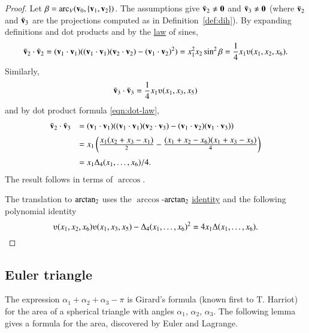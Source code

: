 \begin{proof}
Let $\beta = \operatorname{arc}_V({\mathbf v}_0,\{{\mathbf v}_1,{\mathbf v}_2\})$.
The assumptions give $\bar {{\mathbf v}}_2\ne {\mathbf 0}$ and 
$\bar {{\mathbf v}}_3 \ne {\mathbf 0}$ (where $\bar {{\mathbf v}}_2$ and
$\bar {{\mathbf v}}_3$ are the projections computed as in Definition~\ref{def:dih}).  
%
    By expanding definitions and dot products and by the \hyperref[lemma:los]{law} of sines,
    $$
    \bar \v_2\cdot \bar \v_2 = (\v_1\cdot \v_1) ((\v_1\cdot \v_1)(\v_2\cdot \v_2) -
    (\v_1\cdot \v_2)^2) =  x_1^2 x_2 \sin^2 \beta = \frac{1}{4}
    x_1
    \ups(x_1,x_2,x_6).
    $$
    Similarly,
    $$\bar \v_3 \cdot \bar \v_3 = \frac{1}{4} x_1 \ups(x_1,x_3,x_5)$$
and by dot product formula \eqref{eqn:dot-law},
    $$\begin{array}{lll}
    \bar \v_2\cdot \bar \v_3 &= (\v_1\cdot \v_1)((\v_1\cdot \v_1)(\v_2\cdot \v_3) -
    (\v_1\cdot \v_2)(\v_1\cdot \v_3) ) \vspace{6pt} \\  &
    = x_1 \left(\frac{\displaystyle x_1 (x_2 + x_3 -
    x_1)}{2} - \frac{\displaystyle (x_1 + x_2 - x_6)(x_1 + x_3 -
    x_5)}{4} \right)\vspace{6pt}\\&
    = {x_1\Delta_4(x_1,\ldots,x_6)}/{4}.
    \end{array}
    $$
The result follows in terms of $\arccos$.

The translation to ${\operatorname{arctan_2}}$ uses the $\arccos$-${\operatorname{arctan_2}}$ \hyperref[lemma:arccos-arctan]{identity}
and the following polynomial identity
    $$
    \ups(x_1,x_2,x_6)\ups(x_1,x_3,x_5) - \Delta_4(x_1,\ldots,x_6)^2
    = 4 x_1 \Delta(x_1,\ldots,x_6).
    $$
\end{proof}






\subsection{Euler triangle}

The expression $\alpha_1+\alpha_2+\alpha_3-\pi$ is Girard's
formula (known first to T. Harriot) 
for the area of a spherical triangle with angles
$\alpha_1$, $\alpha_2$, $\alpha_3$.  The following lemma
gives a formula for the area, discovered by
Euler and Lagrange.
%
%
%
%
%

